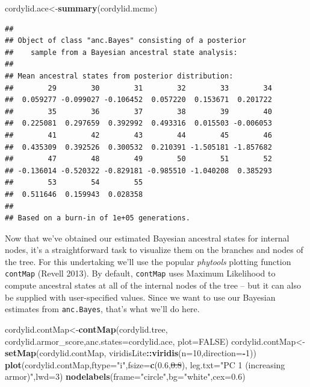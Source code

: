 \documentclass[fleqn,10pt,lineno]{wlpeerj}
\newenvironment{Shaded}{\begin{snugshade}}{\end{snugshade}}
\newcommand{\AttributeTok}[1]{\textcolor[rgb]{0.13,0.29,0.53}{#1}}
\newcommand{\ConstantTok}[1]{\textcolor[rgb]{0.56,0.35,0.01}{#1}}
\newcommand{\DecValTok}[1]{\textcolor[rgb]{0.00,0.00,0.81}{#1}}
\newcommand{\FloatTok}[1]{\textcolor[rgb]{0.00,0.00,0.81}{#1}}
\newcommand{\FunctionTok}[1]{\textcolor[rgb]{0.13,0.29,0.53}{\textbf{#1}}}
\newcommand{\NormalTok}[1]{#1}
\newcommand{\OtherTok}[1]{\textcolor[rgb]{0.56,0.35,0.01}{#1}}
\newcommand{\SpecialCharTok}[1]{\textcolor[rgb]{0.81,0.36,0.00}{\textbf{#1}}}
\newcommand{\StringTok}[1]{\textcolor[rgb]{0.31,0.60,0.02}{#1}}
\providecommand{\DIFaddtex}[1]{{\protect\color{blue}\uwave{#1}}} %
\providecommand{\DIFdeltex}[1]{{\protect\color{red}\sout{#1}}}                      %
\providecommand{\DIFaddbegin}{} %
\providecommand{\DIFaddend}{} %
\providecommand{\DIFdelbegin}{} %
\providecommand{\DIFdelend}{} %
\providecommand{\DIFadd}[1]{\texorpdfstring{\DIFaddtex{#1}}{#1}} %
\providecommand{\DIFdel}[1]{\texorpdfstring{\DIFdeltex{#1}}{}} %
\newcommand{\DIFscaledelfig}{0.5}
\newlength{\DIFdelgraphicswidth} %
\newlength{\DIFdelgraphicsheight} %
\newcommand{\DIFaddincludegraphics}[2][]{{\color{blue}\fbox{\DIFOincludegraphics[#1]{#2}}}} %
\newcommand{\DIFdelincludegraphics}[2][]{%
\sbox{\DIFdelgraphicsbox}{\DIFOincludegraphics[#1]{#2}}%
\settoboxwidth{\DIFdelgraphicswidth}{\DIFdelgraphicsbox} %
\settoboxtotalheight{\DIFdelgraphicsheight}{\DIFdelgraphicsbox} %
\scalebox{\DIFscaledelfig}{%
\parbox[b]{\DIFdelgraphicswidth}{\usebox{\DIFdelgraphicsbox}\\[-\baselineskip] \rule{\DIFdelgraphicswidth}{0em}}\llap{\resizebox{\DIFdelgraphicswidth}{\DIFdelgraphicsheight}{%
\setlength{\unitlength}{\DIFdelgraphicswidth}%
\begin{picture}(1,1)%
\thicklines\linethickness{2pt} %
{\color[rgb]{1,0,0}\put(0,0){\framebox(1,1){}}}%
{\color[rgb]{1,0,0}\put(0,0){\line( 1,1){1}}}%
{\color[rgb]{1,0,0}\put(0,1){\line(1,-1){1}}}%
\end{picture}%
}\hspace*{3pt}}} %
} %
\DeclareRobustCommand{\DIFaddbegin}{\DIFOaddbegin \let\includegraphics\DIFaddincludegraphics} %
\DeclareRobustCommand{\DIFaddend}{\DIFOaddend \let\includegraphics\DIFOincludegraphics} %
\DeclareRobustCommand{\DIFdelbegin}{\DIFOdelbegin \let\includegraphics\DIFdelincludegraphics} %
\DeclareRobustCommand{\DIFdelend}{\DIFOaddend \let\includegraphics\DIFOincludegraphics} %
\begin{document}
\begin{Shaded}
\begin{Highlighting}[]
\NormalTok{cordylid.ace}\OtherTok{\textless{}{-}}\FunctionTok{summary}\NormalTok{(cordylid.mcmc)}
\end{Highlighting}
\end{Shaded}

\begin{verbatim}
## 
## Object of class "anc.Bayes" consisting of a posterior
##    sample from a Bayesian ancestral state analysis:
## 
## Mean ancestral states from posterior distribution:
##        29        30        31        32        33        34 
##  0.059277 -0.099027 -0.106452  0.057220  0.153671  0.201722 
##        35        36        37        38        39        40 
##  0.225081  0.297659  0.392992  0.493316  0.015503 -0.006053 
##        41        42        43        44        45        46 
##  0.435309  0.392526  0.300532  0.210391 -1.505181 -1.857682
##        47        48        49        50        51        52
## -0.136014 -0.520322 -0.829181 -0.985510 -1.040208  0.385293
##        53        54        55 
##  0.511646  0.159943  0.028358 
## 
## Based on a burn-in of 1e+05 generations.
\end{verbatim}

Now that we've obtained our estimated Bayesian ancestral states for
internal nodes, it's a straightforward task to visualize them on the
branches and nodes of the tree. For this undertaking we'll use the
popular \emph{phytools} plotting function \texttt{contMap} (Revell
2013). By default, \texttt{contMap} uses Maximum Likelihood to compute
ancestral states at all of the internal nodes of the tree -- but it can
also be supplied with user-specified values. Since we want to use our
Bayesian estimates from \texttt{anc.Bayes}, that's what we'll do here.

\begin{Shaded}
\begin{Highlighting}[]
\NormalTok{cordylid.contMap}\OtherTok{\textless{}{-}}\FunctionTok{contMap}\NormalTok{(cordylid.tree,}
\NormalTok{  cordylid.armor\_score,}\AttributeTok{anc.states=}\NormalTok{cordylid.ace,}
  \AttributeTok{plot=}\ConstantTok{FALSE}\NormalTok{)}
\NormalTok{cordylid.contMap}\OtherTok{\textless{}{-}}\FunctionTok{setMap}\NormalTok{(cordylid.contMap,}
\NormalTok{  viridisLite}\SpecialCharTok{::}\FunctionTok{viridis}\NormalTok{(}\AttributeTok{n=}\DecValTok{10}\NormalTok{,}\AttributeTok{direction=}\SpecialCharTok{{-}}\DecValTok{1}\NormalTok{))}
\FunctionTok{plot}\NormalTok{(cordylid.contMap,}\AttributeTok{ftype=}\StringTok{"i"}\NormalTok{,}\AttributeTok{fsize=}\FunctionTok{c}\NormalTok{(}\FloatTok{0.6}\NormalTok{,}\DIFdelbegin \DIFdel{\FloatTok{0.8}}\DIFdelend \DIFaddbegin \DIFadd{\FloatTok{0.7}}\DIFaddend \NormalTok{),}
  \AttributeTok{leg.txt=}\StringTok{"PC 1 (increasing armor)"}\NormalTok{,}\AttributeTok{lwd=}\DecValTok{3}\NormalTok{)}
\FunctionTok{nodelabels}\NormalTok{(}\AttributeTok{frame=}\StringTok{"circle"}\NormalTok{,}\AttributeTok{bg=}\StringTok{"white"}\NormalTok{,}\AttributeTok{cex=}\FloatTok{0.6}\NormalTok{)}
\end{Highlighting}
\end{Shaded}
\end{document}
